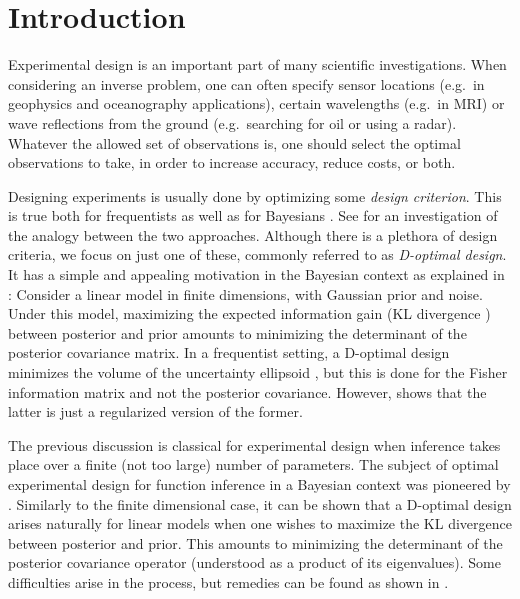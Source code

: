 \section{Introduction}\label{section:OED intro}
Experimental design is an important part of many scientific
investigations. When considering an inverse problem, one can often
specify sensor locations (e.g.\ in geophysics and oceanography
applications), certain wavelengths (e.g.\ in MRI) or wave reflections
from the ground (e.g.\ searching for oil or using a radar). Whatever
the allowed set of observations is, one should select the optimal
observations to take, in order to increase accuracy, reduce costs, or
both.

Designing experiments is usually done by optimizing some \emph{design
criterion}. This is true both for frequentists
\cite{silvey2013,Ucinski05} as well as for Bayesians
\cite{Chaloner1995}. See \cite{Chaloner1995} for an investigation of
the analogy between the two approaches. Although there is a plethora
of design criteria, we focus on just one of these, commonly referred
to as \emph{D-optimal design}. It has a simple and appealing
motivation in the Bayesian context as explained in
\cite{Chaloner1995}: Consider a linear model in finite dimensions,
with Gaussian prior and noise. Under this model, maximizing the
expected information gain (KL divergence \cite{CoverThomas91}) between
posterior and prior amounts to minimizing the determinant of the
posterior covariance matrix. In a frequentist setting, a D-optimal
design minimizes the volume of the uncertainty ellipsoid \cite[page
  16]{Ucinski05}, but this is done for the Fisher information matrix
and not the posterior covariance. However, \cite{Chaloner1995} shows
that the latter is just a regularized version of the former.

The previous discussion is classical for experimental design when
inference takes place over a finite (not too large) number of
parameters. The subject of optimal experimental design for function
inference in a Bayesian context was pioneered by
\cite{AlexanderianGloorGhattas14, AlexanderianPetraStadlerEtAl16,
  AlexanderianPetraStadlerEtAl14}. Similarly to the finite dimensional
case, it can be shown that a D-optimal design arises naturally for
linear models when one wishes to maximize the KL divergence between
posterior and prior. This amounts to minimizing the determinant of the
posterior covariance operator (understood as a product of its
eigenvalues). Some difficulties arise in the process, but remedies can
be found as shown in \cite{AlexanderianGloorGhattas14}.

